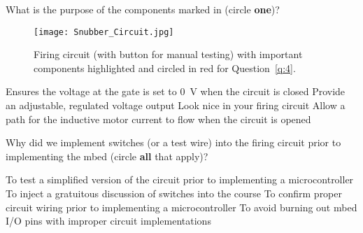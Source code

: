 \documentclass[addpoints,noanswers]{exam}
\begin{document}
\begin{questions}
\clearpage
\question[1]\label{q:4}
What is the purpose of the components marked in  (circle {\bf one})?
\begin{figure}[h]
\centering
	\texttt{[image: Snubber\_Circuit.jpg]}
	\caption{Firing circuit (with button for manual testing) with important components highlighted and circled in red for Question~\ref{q:4}.}
	\label{fig:Snubber}
\end{figure}
\begin{choices}
\choice Ensures the voltage at the gate is set to \SI{0}{\volt} when the circuit is closed
\choice Provide an adjustable, regulated voltage output  
\choice Look nice in your firing circuit
\CorrectChoice Allow a path for the inductive motor current to flow when the circuit is opened
\end{choices}













\question[1]
Why did we implement switches (or a test wire) into the firing circuit prior to implementing the mbed (circle {\bf all} that apply)?
\begin{choices}
\CorrectChoice To test a simplified version of the circuit prior to implementing a microcontroller
\choice To inject a gratuitous discussion of switches into the course
\CorrectChoice To confirm proper circuit wiring prior to implementing a microcontroller
\CorrectChoice To avoid burning out mbed I/O pins with improper circuit implementations
\end{choices}






\end{questions}
\end{document}
